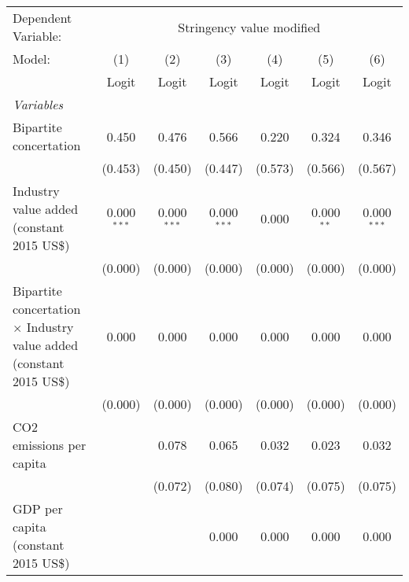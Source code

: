 
\begingroup
\centering
\begin{tabular}{lcccccc}
   \toprule
   Dependent Variable: & \multicolumn{6}{c}{Stringency value modified}\\
   Model:                                                                      & (1)           & (2)           & (3)           & (4)           & (5)            & (6)\\  
                                                                               &  Logit        & Logit         & Logit         & Logit         & Logit          & Logit\\  
   \midrule
   \emph{Variables}\\
   Bipartite concertation                                                      & 0.450         & 0.476         & 0.566         & 0.220         & 0.324          & 0.346\\   
                                                                               & (0.453)       & (0.450)       & (0.447)       & (0.573)       & (0.566)        & (0.567)\\   
   Industry value added (constant 2015 US\$)                                   & 0.000$^{***}$ & 0.000$^{***}$ & 0.000$^{***}$ & 0.000         & 0.000$^{**}$   & 0.000$^{***}$\\   
                                                                               & (0.000)       & (0.000)       & (0.000)       & (0.000)       & (0.000)        & (0.000)\\   
   Bipartite concertation $\times$ Industry value added (constant 2015 US\$)   & 0.000         & 0.000         & 0.000         & 0.000         & 0.000          & 0.000\\   
                                                                               & (0.000)       & (0.000)       & (0.000)       & (0.000)       & (0.000)        & (0.000)\\   
   CO2 emissions per capita                                                    &               & 0.078         & 0.065         & 0.032         & 0.023          & 0.032\\   
                                                                               &               & (0.072)       & (0.080)       & (0.074)       & (0.075)        & (0.075)\\   
   GDP per capita (constant 2015 US\$)                                         &               &               & 0.000         & 0.000         & 0.000          & 0.000\\   

\end{tabular}
